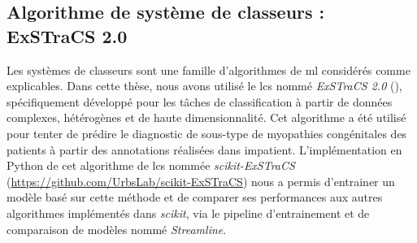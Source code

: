 \subsection{Algorithme de système de classeurs : ExSTraCS 2.0}
Les systèmes de classeurs sont une famille d'algorithmes de \gls{ml} considérés comme explicables. Dans cette thèse, nous avons utilisé le \gls{lcs} nommé \textit{ExSTraCS 2.0} (\cite{urbanowicz_exstracs_2015}), spécifiquement développé pour les tâches de classification à partir de données complexes, hétérogènes et de haute dimensionnalité. Cet algorithme a été utilisé pour tenter de prédire le diagnostic de sous-type de myopathies congénitales des patients à partir des annotations réalisées dans \gls{impatient}. L'implémentation en Python de cet algorithme de \gls{lcs} nommée \textit{scikit-ExSTraCS} (\href{https://github.com/UrbsLab/scikit-ExSTraCS}{https://github.com/UrbsLab/scikit-ExSTraCS}) nous a permis d'entrainer un modèle basé sur cette méthode et de comparer ses performances aux autres algorithmes implémentés dans \textit{scikit}, via le pipeline d'entrainement et de comparaison de modèles nommé \textit{Streamline}.

